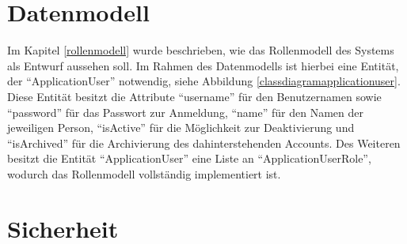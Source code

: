 
\newpage

\section{Datenmodell}
Im Kapitel \ref{rollenmodell} wurde beschrieben, wie das Rollenmodell des Systems als Entwurf aussehen soll.
Im Rahmen des Datenmodells ist hierbei eine Entität, der \enquote{ApplicationUser} notwendig, siehe Abbildung \ref{classdiagramapplicationuser}. Diese Entität besitzt die Attribute \enquote{username} für den Benutzernamen sowie \enquote{password} für das Passwort zur Anmeldung, \enquote{name} für den Namen der jeweiligen Person, \enquote{isActive} für die Möglichkeit zur Deaktivierung und \enquote{isArchived} für die Archivierung des dahinterstehenden Accounts. Des Weiteren besitzt die Entität \enquote{ApplicationUser} eine Liste an \enquote{ApplicationUserRole}, wodurch das Rollenmodell vollständig implementiert ist.




\newpage

\section{Sicherheit}